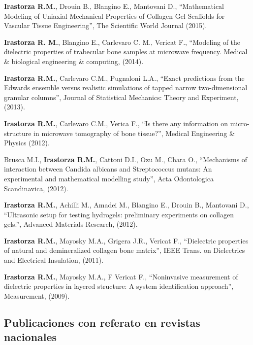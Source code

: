 \documentclass[margin,line]{res}
\begin{document}
\begin{resume}
\textbf{Irastorza R.M.}, Drouin B., Blangino E., Mantovani D., ``Mathematical Modeling of Uniaxial Mechanical Properties of Collagen Gel Scaffolds for Vascular Tissue Engineering'', The Scientific World Journal (2015).

\textbf{Irastorza R. M.}, Blangino E., Carlevaro C. M., Vericat F., ``Modeling of the dielectric properties of trabecular bone samples at microwave frequency. Medical \& biological engineering \& computing, (2014).

\textbf{Irastorza R.M.}, Carlevaro C.M., Pugnaloni L.A., ``Exact predictions from the Edwards ensemble versus realistic simulations of tapped narrow two-dimensional granular columns'', Journal of Statistical Mechanics: Theory and Experiment, (2013).

\textbf{Irastorza R.M.}, Carlevaro C.M., Verica F., ``Is there any information on micro-structure in microwave tomography of bone tissue?'', Medical Engineering \& Physics (2012).

Brusca M.I., {\bf Irastorza R.M.}, Cattoni D.I., Ozu M., Chara O., ``Mechanisms of interaction between Candida albicans and Streptococcus mutans: An experimental and mathematical modelling study'', Acta Odontologica Scandinavica, (2012).

\textbf{Irastorza R.M.}, Achilli M., Amadei M., Blangino E., Drouin B., Mantovani D., ``Ultrasonic setup for testing hydrogels: preliminary experiments on collagen gels.'', Advanced Materials Research, (2012).

\textbf{Irastorza R.M.}, Mayosky M.A., Grigera J.R., Vericat F., ``Dielectric properties of natural and demineralized collagen bone matrix'', IEEE Trans. on Dielectrics and Electrical Insulation, (2011).
%
%

{\bf Irastorza R.M.}, Mayosky M.A., F Vericat F., ``Noninvasive measurement of dielectric properties in layered structure: A system identification approach'', Measurement, (2009).

\subsection{ Publicaciones con referato en revistas nacionales}


\end{resume}
\end{document}
